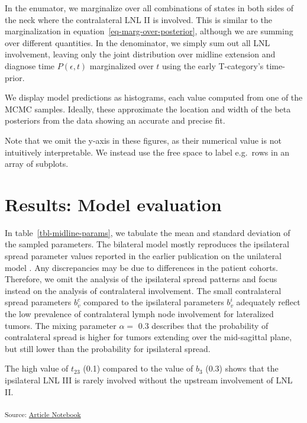 \documentclass[
  sn-mathphys-num,
]{sn-jnl}
\begin{document}
In the enumator, we marginalize over all combinations of states in both
sides of the neck where the contralateral LNL II is involved. This is
similar to the marginalization in equation~\ref{eq-marg-over-posterior},
although we are summing over different quantities. In the denominator,
we simply sum out all LNL involvement, leaving only the joint
distribution over midline extension and diagnose time
\(P \left( \epsilon, t \right)\) marginalized over \(t\) using the early
T-category's time-prior.

We display model predictions as histograms, each value computed from one
of the MCMC samples. Ideally, these approximate the location and width
of the beta posteriors from the data showing an accurate and precise
fit.

Note that we omit the y-axis in these figures, as their numerical value
is not intuitively interpretable. We instead use the free space to label
e.g.~rows in an array of subplots.

\section{Results: Model evaluation}\label{sec-results}

In table~\ref{tbl-midline-params}, we tabulate the mean and standard
deviation of the sampled parameters. The bilateral model mostly
reproduces the ipsilateral spread parameter values reported in the
earlier publication on the unilateral model
\citep{ludwig_modelling_2023}. Any discrepancies may be due to
differences in the patient cohorts. Therefore, we omit the analysis of
the ipsilateral spread patterns and focus instead on the analysis of
contralateral involvement. The small contralateral spread parameters
\(b^c_v\) compared to the ipsilateral parameters \(b^i_v\) adequately
reflect the low prevalence of contralateral lymph node involvement for
lateralized tumors. The mixing parameter \(\alpha=\) 0.3 describes that
the probability of contralateral spread is higher for tumors extending
over the mid-sagittal plane, but still lower than the probability for
ipsilateral spread.

The high value of \(t_{23}\) (0.1) compared to the value of \(b_3\)
(0.3) shows that the ipsilateral LNL III is rarely involved without the
upstream involvement of LNL II.

\textsubscript{Source:
\href{https://rmnldwg.github.io/bilateral-paper/manuscript.qmd.html}{Article
Notebook}}
\end{document}
